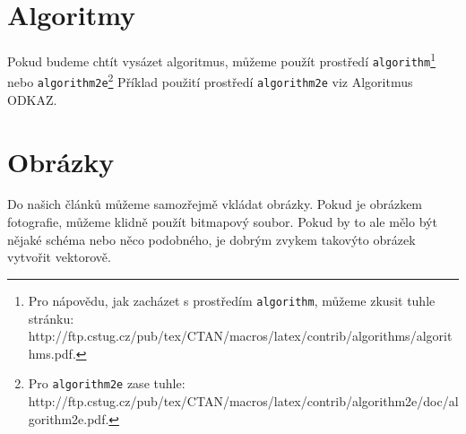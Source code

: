 \documentclass[11pt,a4paper]{article}
\begin{document}

\section{Algoritmy} \label{sec:algoritmy}
Pokud budeme chtít vysázet algoritmus, můžeme použít prostředí \verb|algorithm|\footnote{Pro nápovědu, jak zacházet s prostředím \texttt{algorithm}, můžeme zkusit tuhle stránku: http://ftp.cstug.cz/pub/tex/CTAN/macros/latex/contrib/algorithms/algorithms.pdf.} nebo \verb|algorithm2e|\footnote{Pro \texttt{algorithm2e} zase tuhle: http://ftp.cstug.cz/pub/tex/CTAN/macros/latex/contrib/algorithm2e/doc/algorithm2e.pdf.} Příklad použití prostředí \verb|algorithm2e| viz Algoritmus ODKAZ.


\section{Obrázky}
Do našich článků můžeme samozřejmě vkládat obrázky. Pokud je obrázkem fotografie, můžeme klidně použít bitmapový soubor. Pokud by to ale mělo být nějaké schéma nebo něco podobného, je dobrým zvykem takovýto obrázek vytvořit vektorově.
\end{document}
